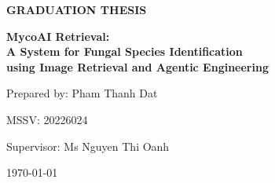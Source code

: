 \begin{titlepage}
    \centering
    \vspace*{1cm}
    {\Huge \textbf{GRADUATION THESIS} \par}
    \vspace{2cm}
    {\Large \textbf{MycoAI Retrieval: \\ A System for Fungal Species Identification \\ using Image Retrieval and Agentic Engineering} \par}
    \vspace{2cm}
    {\large Prepared by: Pham Thanh Dat \par}
    \vspace{0.3cm}
    {\large MSSV: 20226024 \par}
    \vspace{1cm}
    {\large Supervisor: Ms Nguyen Thi Oanh \par}
    \vfill
    {\large \today \par}
\end{titlepage}
